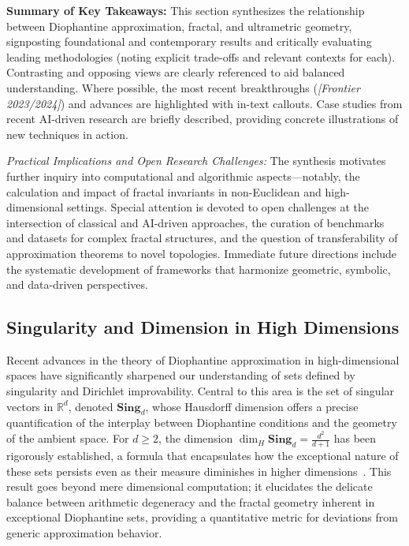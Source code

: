 \documentclass[sigconf]{acmart}
\begin{document}
\textbf{Summary of Key Takeaways:} This section synthesizes the relationship between Diophantine approximation, fractal, and ultrametric geometry, signposting foundational and contemporary results and critically evaluating leading methodologies (noting explicit trade-offs and relevant contexts for each). Contrasting and opposing views are clearly referenced to aid balanced understanding. Where possible, the most recent breakthroughs (\textit{[Frontier 2023/2024]}) and advances are highlighted with in-text callouts. Case studies from recent AI-driven research are briefly described, providing concrete illustrations of new techniques in action.

\textit{Practical Implications and Open Research Challenges:} The synthesis motivates further inquiry into computational and algorithmic aspects---notably, the calculation and impact of fractal invariants in non-Euclidean and high-dimensional settings. Special attention is devoted to open challenges at the intersection of classical and AI-driven approaches, the curation of benchmarks and datasets for complex fractal structures, and the question of transferability of approximation theorems to novel topologies.  Immediate future directions include the systematic development of frameworks that harmonize geometric, symbolic, and data-driven perspectives.


\subsection{Singularity and Dimension in High Dimensions}

Recent advances in the theory of Diophantine approximation in high-dimensional spaces have significantly sharpened our understanding of sets defined by singularity and Dirichlet improvability. Central to this area is the set of singular vectors in $\mathbb{R}^d$, denoted $\mathbf{Sing}_d$, whose Hausdorff dimension offers a precise quantification of the interplay between Diophantine conditions and the geometry of the ambient space. For $d \geq 2$, the dimension $\dim_H \mathbf{Sing}_d = \frac{d^2}{d+1}$ has been rigorously established, a formula that encapsulates how the exceptional nature of these sets persists even as their measure diminishes in higher dimensions~\cite{ref109}. This result goes beyond mere dimensional computation; it elucidates the delicate balance between arithmetic degeneracy and the fractal geometry inherent in exceptional Diophantine sets, providing a quantitative metric for deviations from generic approximation behavior.
\end{document}

